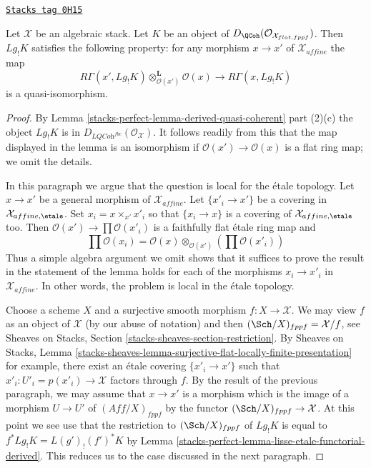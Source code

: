 \begin{lemma}
\label{stacks-perfect-lemma-higher-shriek-QC}
\href{https://stacks.math.columbia.edu/tag/0H15}{\texttt{Stacks tag 0H15}}

Let $\mathcal{X}$ be an algebraic stack. Let $K$ be an object of
$D_\QCoh(\mathcal{O}_{\mathcal{X}_{flat, fppf}})$. Then $Lg_!K$ satisfies
the following property: for any morphism $x \to x'$ of
$\mathcal{X}_{affine}$ the map
$$
R\Gamma(x', Lg_!K) \otimes_{\mathcal{O}(x')}^\mathbf{L} \mathcal{O}(x)
\longrightarrow
R\Gamma(x, Lg_!K)
$$
is a quasi-isomorphism.
\end{lemma}

\begin{proof}
By Lemma \ref{stacks-perfect-lemma-derived-quasi-coherent} part (2)(c) the object
$Lg_!K$ is in $D_{\textit{LQCoh}^{fbc}}(\mathcal{O}_\mathcal{X})$.
It follows readily from this that the map displayed in the lemma
is an isomorphism if $\mathcal{O}(x') \to \mathcal{O}(x)$ is a flat
ring map; we omit the details.

\medskip\noindent
In this paragraph we argue that the question is local for the \'etale topology.
Let $x \to x'$ be a general morphism of $\mathcal{X}_{affine}$.
Let $\{x'_i \to x'\}$ be a covering in
$\mathcal{X}_{affine, \etale}$. Set $x_i = x \times_{x'} x'_i$
so that $\{x_i \to x\}$ is a covering of $\mathcal{X}_{affine, \etale}$
too. Then $\mathcal{O}(x') \to \prod \mathcal{O}(x'_i)$ is a
faithfully flat \'etale ring map and
$$
\prod \mathcal{O}(x_i) =
\mathcal{O}(x) \otimes_{\mathcal{O}(x')} \left(\prod \mathcal{O}(x'_i)\right)
$$
Thus a simple algebra argument we omit shows that
it suffices to prove the result in the statement of the lemma
holds for each of the morphisms $x_i \to x'_i$ in
$\mathcal{X}_{affine}$. In other words, the problem is local in
the \'etale topology.

\medskip\noindent
Choose a scheme $X$ and a surjective smooth morphism $f : X \to \mathcal{X}$.
We may view $f$ as an object of $\mathcal{X}$ (by our abuse of notation)
and then $(\Sch/X)_{fppf} = \mathcal{X}/f$, see
Sheaves on Stacks, Section \ref{stacks-sheaves-section-restriction}.
By Sheaves on Stacks, Lemma
\ref{stacks-sheaves-lemma-surjective-flat-locally-finite-presentation}
for example, there exist an \'etale covering $\{x'_i \to x'\}$
such that $x'_i : U'_i = p(x'_i) \to \mathcal{X}$ factors through $f$.
By the result of the previous paragraph,
we may assume that $x \to x'$ is a morphism which is the
image of a morphism $U \to U'$ of $(\textit{Aff}/X)_{fppf}$ by the functor
$(\Sch/X)_{fppf} \to \mathcal{X}$.
At this point we see use that the restriction to $(\Sch/X)_{fppf}$
of $Lg_!K$ is equal to $f^*Lg_!K = L(g')_!(f')^*K$ by
Lemma \ref{stacks-perfect-lemma-lisse-etale-functorial-derived}.
This reduces us to the case discussed in the next paragraph.


\end{proof}
